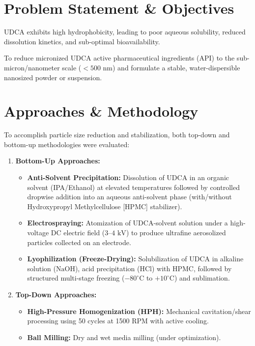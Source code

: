 \documentclass[11pt,a4paper]{article}
\begin{document}
\section{Problem Statement \& Objectives}
\begin{description}[style=multiline,leftmargin=3.5cm]
    \item[Problem Statement:] UDCA exhibits high hydrophobicity, leading to poor aqueous solubility, reduced dissolution kinetics, and sub-optimal bioavailability.
    \item[Project Objective:] To reduce micronized UDCA active pharmaceutical ingredients (API) to the sub-micron/nanometer scale ($<500\text{ nm}$) and formulate a stable, water-dispersible nanosized powder or suspension.
\end{description}

\section{Approaches \& Methodology}
To accomplish particle size reduction and stabilization, both top-down and bottom-up methodologies were evaluated:

\begin{enumerate}
    \item \textbf{Bottom-Up Approaches:}
    \begin{itemize}
        \item \textbf{Anti-Solvent Precipitation:} Dissolution of UDCA in an organic solvent (IPA/Ethanol) at elevated temperatures followed by controlled dropwise addition into an aqueous anti-solvent phase (with/without Hydroxypropyl Methylcellulose [HPMC] stabilizer).
        \item \textbf{Electrospraying:} Atomization of UDCA-solvent solution under a high-voltage DC electric field ($3$--$4\text{ kV}$) to produce ultrafine aerosolized particles collected on an electrode.
        \item \textbf{Lyophilization (Freeze-Drying):} Solubilization of UDCA in alkaline solution ($\text{NaOH}$), acid precipitation ($\text{HCl}$) with HPMC, followed by structured multi-stage freezing ($-80^\circ\text{C}$ to $+10^\circ\text{C}$) and sublimation.
    \end{itemize}
    \item \textbf{Top-Down Approaches:}
    \begin{itemize}
        \item \textbf{High-Pressure Homogenization (HPH):} Mechanical cavitation/shear processing using 50 cycles at 1500 RPM with active cooling.
        \item \textbf{Ball Milling:} Dry and wet media milling (under optimization).
    \end{itemize}
\end{enumerate}
\end{document}
